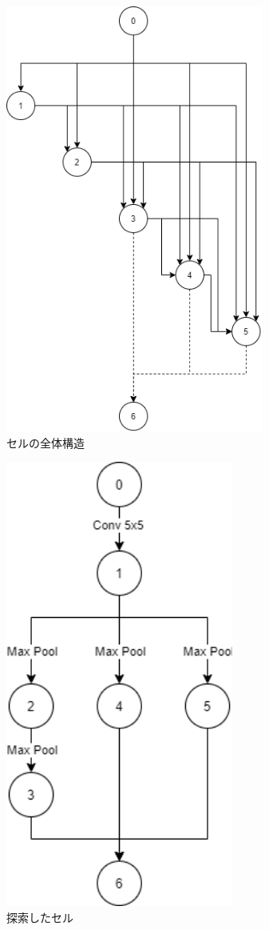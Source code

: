 \documentclass[twocolumn]{jarticle}     %
\begin{document}
\begin{figure}[tb]
	\begin{center}
		\includegraphics[clip,width=8.5cm]{search.png}
		\caption{セルの全体構造}
		\label{fig:model}
	\end{center}
\end{figure}

\begin{figure}[tb]
	\begin{center}
		\includegraphics[clip,width=7.5cm]{normal.png}
		\caption{探索したセル}
		\label{fig:cell}
	\end{center}
\end{figure}
\end{document}
